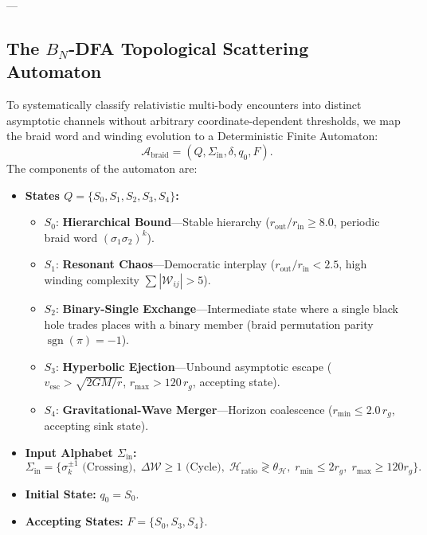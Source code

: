 \documentclass[11pt,a4paper,reqno]{article}
\theoremstyle{plain}
\theoremstyle{definition}
\theoremstyle{remark}
\numberwithin{equation}{section}
\begin{document}
---

\subsection{The \texorpdfstring{$B_N$}{BN}-DFA Topological Scattering Automaton}

To systematically classify relativistic multi-body encounters into distinct asymptotic channels without arbitrary coordinate-dependent thresholds, we map the braid word and winding evolution to a Deterministic Finite Automaton:
\begin{equation}
\mathcal{A}_{\mathrm{braid}} = \left( Q, \Sigma_{\mathrm{in}}, \delta, q_0, F \right).
\end{equation}
The components of the automaton are:
\begin{itemize}
    \item \textbf{States $Q = \{S_0, S_1, S_2, S_3, S_4\}$:}
    \begin{itemize}
        \item $S_0$: \textbf{Hierarchical Bound}---Stable hierarchy ($r_{\mathrm{out}} / r_{\mathrm{in}} \ge 8.0$, periodic braid word $(\sigma_1 \sigma_2)^k$).
        \item $S_1$: \textbf{Resonant Chaos}---Democratic interplay ($r_{\mathrm{out}} / r_{\mathrm{in}} < 2.5$, high winding complexity $\sum |\mathcal{W}_{ij}| > 5$).
        \item $S_2$: \textbf{Binary-Single Exchange}---Intermediate state where a single black hole trades places with a binary member (braid permutation parity $\operatorname{sgn}(\pi) = -1$).
        \item $S_3$: \textbf{Hyperbolic Ejection}---Unbound asymptotic escape ($v_{\mathrm{esc}} > \sqrt{2GM / r}$, $r_{\max} > 120 \, r_g$, accepting state).
        \item $S_4$: \textbf{Gravitational-Wave Merger}---Horizon coalescence ($r_{\min} \le 2.0 \, r_g$, accepting sink state).
    \end{itemize}
    \item \textbf{Input Alphabet $\Sigma_{\mathrm{in}}$:}
    \begin{equation}
    \Sigma_{\mathrm{in}} = \{ \sigma_k^{\pm 1} \text{ (Crossing)}, \; \Delta \mathcal{W} \ge 1 \text{ (Cycle)}, \; \mathcal{H}_{\mathrm{ratio}} \gtrless \theta_{\mathcal{H}}, \; r_{\min} \le 2 r_g, \; r_{\max} \ge 120 r_g \}.
    \end{equation}
    \item \textbf{Initial State:} $q_0 = S_0$.
    \item \textbf{Accepting States:} $F = \{S_0, S_3, S_4\}$.
\end{itemize}
\end{document}
